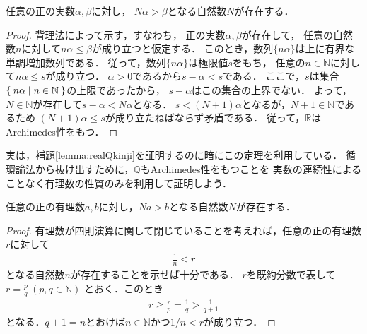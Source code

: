      \begin{thm}[実数のArchimedes性] \label{thm:Archimedesaxiom}
       任意の正の実数$\alpha ,  \beta$に対し，
       $N \alpha > \beta$となる自然数$N$が存在する．
     \end{thm}
     \begin{proof}
       背理法によって示す，すなわち，
       正の実数$\alpha ,  \beta$が存在して，
       任意の自然数$n$に対して$n \alpha \leq \beta$が成り立つと仮定する．
       このとき，数列$\{ n \alpha \}$は上に有界な単調増加数列である．
       従って，数列$\{ n \alpha \}$は極限値$s$をもち，
       任意の$n \in \mathbb{N}$に対して$n \alpha \leq s$が成り立つ．
       $\alpha > 0 $であるから$s - \alpha < s$である．
       ここで，$s$は集合$\Set{ n \alpha \mid n \in \mathbb{N}}$の上限であったから，
       $s - \alpha $はこの集合の上界でない．
       よって，$N \in \mathbb{N}$が存在して$s - \alpha < N \alpha$となる．
       $s < (N+1) \alpha $となるが，$N + 1 \in \mathbb{N}$であるため
       $(N+1) \alpha \leq s$が成り立たねばならず矛盾である．
       従って，$\mathbb{R}$はArchimedes性をもつ．
     \end{proof}
     実は，補題\ref{lemma:realQkinji}を証明するのに暗にこの定理を利用している．
     循環論法から抜け出すために，$\mathbb{Q}$もArchimedes性をもつことを
     実数の連続性によることなく有理数の性質のみを利用して証明しよう．
     
     \begin{thm}[有理数のArchimedes性] \label{thm:ArchimedesaxiomQ}
       任意の正の有理数$a,  b$に対し，$Na>b$となる自然数$N$が存在する．
     \end{thm}
     \begin{proof}
       有理数が四則演算に関して閉じていることを考えれば，任意の正の有理数$r$に対して
       \begin{align*}
         \frac{1}{n} < r
       \end{align*}
       となる自然数$n$が存在することを示せば十分である．
       $r$を既約分数で表して$r=\displaystyle \frac{p}{q} \ ( p,  q \in \mathbb{N} )$
       とおく．このとき
       \begin{align*}
         r \geq \frac{r}{p} = \frac{1}{q} > \frac{1}{q+1}
       \end{align*}
       となる．$q+1=n$とおけば$n \in \mathbb{N}$かつ$1/n <r$が成り立つ．
     \end{proof}

